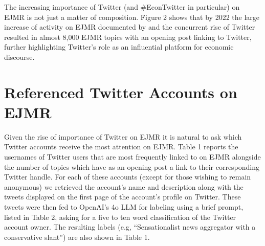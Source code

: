 \documentclass[PP]{AEA}
\begin{document}
The increasing importance of Twitter (and \#EconTwitter in particular) on EJMR is not just a matter of composition. Figure 2 shows that by 2022 the large increase of activity on EJMR documented by \cite{ederer2024anonymity} and the concurrent rise of Twitter resulted in almost 8,000 EJMR topics with an opening post linking to Twitter, further highlighting Twitter's role as an influential platform for economic discourse.


\section{Referenced Twitter Accounts on EJMR}

Given the rise of importance of Twitter on EJMR it is natural to ask which Twitter accounts receive the most attention on EJMR. Table 1 reports the usernames of Twitter users that are most frequently linked to on EJMR alongside the number of topics which have as an opening post a link to their corresponding Twitter handle. For each of these accounts (except for those wishing to remain anonymous) we retrieved the account's name and description along with the tweets displayed on the first page of the account's profile on Twitter. These tweets were then fed to OpenAI's 4o LLM \citep{achiam2023gpt} for labeling using a brief prompt, listed in Table 2, asking for a five to ten word classification of the Twitter account owner. The resulting labels (e.g, ``Sensationalist news aggregator with a conservative slant'') are also shown in Table 1. 
\end{document}

